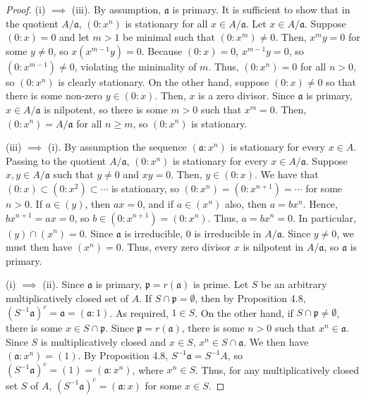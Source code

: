 \begin{proof}
(i) $\implies$ (iii). By assumption, $\mathfrak{a}$ is primary. It is sufficient to show that in the quotient $A/\mathfrak{a}$, $(0:x^n)$ is stationary for all $x \in A/\mathfrak{a}$.
Let $x \in A/\mathfrak{a}$. Suppose $(0:x) = 0$ and let $m > 1$ be minimal such that $(0:x^m) \neq 0$. Then, $x^m y = 0$ for some $y \neq 0$, so $x (x^{m-1} y) = 0$.
Because $(0:x) = 0$, $x^{m-1} y = 0$, so $(0:x^{m-1}) \neq 0$, violating the minimality of $m$. Thus, $(0:x^n) = 0$ for all $n > 0$, so $(0:x^n)$ is clearly stationary. On the other
hand, suppose $(0:x) \neq 0$ so that there is some non-zero $y \in (0:x)$. Then, $x$ is a zero divisor. Since $\mathfrak{a}$ is primary, $x \in A/\mathfrak{a}$ is nilpotent, so there
is some $m > 0$ such that $x^m = 0$. Then, $(0:x^n) = A/\mathfrak{a}$ for all $n \ge m$, so $(0:x^n)$ is stationary.

(iii) $\implies$ (i). By assumption the sequence $(\mathfrak{a}:x^n)$ is stationary for every $x \in A$. Passing to the quotient $A/\mathfrak{a}$, $(0:x^n)$ is stationary
for every $x \in A/\mathfrak{a}$. Suppose $x,y \in A/\mathfrak{a}$ such that $y \neq 0$ and $xy = 0$. Then, $y \in (0:x)$. We have that $(0:x) \subset (0:x^2) \subset \cdots$
is stationary, so $(0:x^n) = (0:x^{n+1}) = \cdots$ for some $n > 0$. If $a \in (y)$, then $ax = 0$, and if $a \in (x^n)$ also, then $a = bx^n$. Hence, $bx^{n+1} = ax = 0$,
so $b \in (0:x^{n+1}) = (0:x^n)$. Thus, $a = bx^n = 0$. In particular, $(y) \cap (x^n) = 0$. Since $\mathfrak{a}$ is irreducible, $0$ is irreducible in $A/\mathfrak{a}$. Since
$y \neq 0$, we must then have $(x^n) = 0$. Thus, every zero divisor $x$ is nilpotent in $A/\mathfrak{a}$, so $\mathfrak{a}$ is primary.

(i) $\implies$ (ii). Since $\mathfrak{a}$ is primary, $\mathfrak{p} = r(\mathfrak{a})$ is prime. Let $S$ be an arbitrary multiplicatively closed set of $A$. If
$S \cap \mathfrak{p} = \emptyset$, then by Proposition 4.8, $(S^{-1}\mathfrak{a})^c = \mathfrak{a} = (\mathfrak{a}:1)$. As required, $1 \in S$. On the other hand,
if $S \cap \mathfrak{p} \neq \emptyset$, there is some $x \in S \cap \mathfrak{p}$. Since $\mathfrak{p} = r(\mathfrak{a})$, there is some $n > 0$ such that $x^n \in \mathfrak{a}$. 
Since $S$ is multiplicatively closed and $x \in S$, $x^n \in S \cap \mathfrak{a}$. We then have $(\mathfrak{a}:x^n) = (1)$. By Proposition 4.8, $S^{-1}\mathfrak{a} = S^{-1}A$, 
so $(S^{-1}\mathfrak{a})^c = (1) = (\mathfrak{a}:x^n)$, where $x^n \in S$. Thus, for any multiplicatively closed set $S$ of $A$, $(S^{-1}\mathfrak{a})^c = (\mathfrak{a}:x)$ for
some $x \in S$.


\end{proof}
